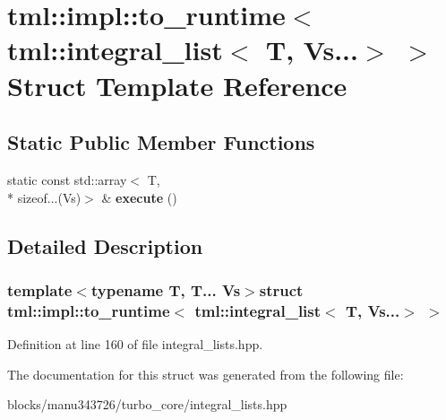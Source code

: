 \hypertarget{structtml_1_1impl_1_1to__runtime_3_01tml_1_1integral__list_3_01_t_00_01_vs_8_8_8_4_01_4}{\section{tml\+:\+:impl\+:\+:to\+\_\+runtime$<$ tml\+:\+:integral\+\_\+list$<$ T, Vs...$>$ $>$ Struct Template Reference}
\label{structtml_1_1impl_1_1to__runtime_3_01tml_1_1integral__list_3_01_t_00_01_vs_8_8_8_4_01_4}
}
\subsection*{Static Public Member Functions}
\begin{DoxyCompactItemize}
\item 
\hypertarget{structtml_1_1impl_1_1to__runtime_3_01tml_1_1integral__list_3_01_t_00_01_vs_8_8_8_4_01_4_a87958fbad726e29183a4953283a5ddc7}{static const std\+::array$<$ T, \\*
sizeof...(Vs)$>$ \& {\bfseries execute} ()}\label{structtml_1_1impl_1_1to__runtime_3_01tml_1_1integral__list_3_01_t_00_01_vs_8_8_8_4_01_4_a87958fbad726e29183a4953283a5ddc7}

\end{DoxyCompactItemize}


\subsection{Detailed Description}
\subsubsection*{template$<$typename T, T... Vs$>$struct tml\+::impl\+::to\+\_\+runtime$<$ tml\+::integral\+\_\+list$<$ T, Vs...$>$ $>$}



Definition at line 160 of file integral\+\_\+lists.\+hpp.



The documentation for this struct was generated from the following file\+:\begin{DoxyCompactItemize}
\item 
blocks/manu343726/turbo\+\_\+core/integral\+\_\+lists.\+hpp\end{DoxyCompactItemize}
